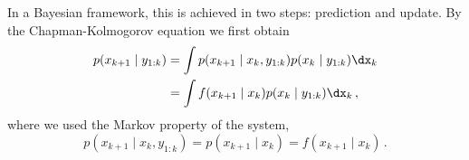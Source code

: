 In a Bayesian framework, this is achieved in two steps:
prediction and update. By the Chapman-Kolmogorov equation we first
obtain
\begin{align*}
  p(x_{k+1} \mid y_{1:k}) &= \int p(x_{k+1} \mid x_k, y_{1:k}) p(x_k \mid y_{1:k}) \dx_k \\
                          &= \int f(x_{k+1} \mid x_k) p(x_k \mid y_{1:k}) \dx_k \,,
\end{align*}
where we used the Markov property of the system, \ie
\[
  p(x_{k+1} \mid x_k, y_{1:k}) = p(x_{k+1} \mid x_k) = f(x_{k+1} \mid
  x_k) \,.
\]